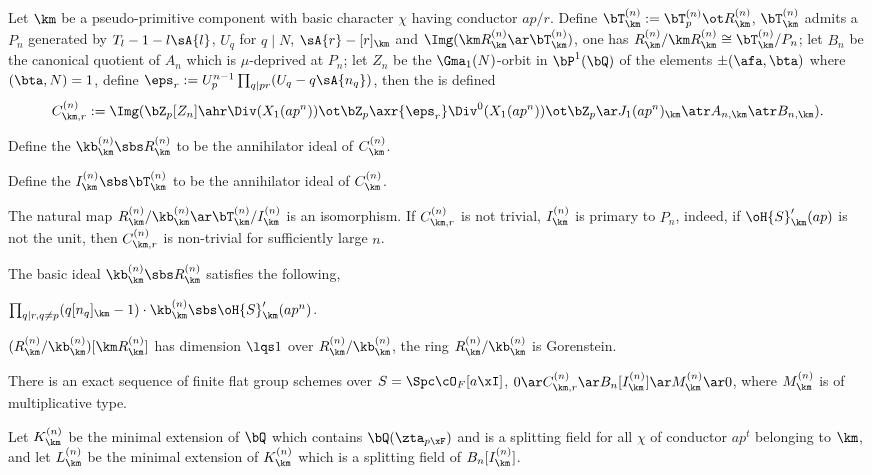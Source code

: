 \documentclass[article, a4paper, twoside]{universal}
\begin{document}
\begin{dfn}[{\cite[4.3~Definition, 5.1]{MW1984}}]
	Let $\km$ be a pseudo-primitive component with basic character $\chi$ having conductor $ap/r$. Define $\bT^{(n)}_{\km}:=\bT^{(n)}_{p}\ot R_{\km}^{(n)}$, $\bT_{\km}^{(n)}$ admits a  $P_{n}$ generated by $T_{l}-1-l\sA{l}$, $U_{q}$ for $q\mid N$, $\sA{r}-[r]_{\km}$ and $\Img(\km R_{\km}^{(n)}\ar\bT_{\km}^{(n)})$, one has $R_{\km}^{(n)}/\km R_{\km}^{(n)}\cong \bT_{\km}^{(n)}/P_{n}$; let $B_{n}$ be the canonical quotient of $A_{n}$ which is $\mu$-deprived at $P_{n}$; let $Z_{n}$ be the $\Gma_{1}(N)$-orbit in $\bP^{1}(\bQ)$ of the elements $\pm(\afa,\bta)$ where $(\bta,N)=1$, define $\eps_{r}:=U_{p}^{n-1}\prod_{q\mid pr}(U_{q}-q\sA{n_{q}})$, then the  is defined
	\[
		C_{\km,r}^{(n)}:=\Img(\bZ_{p}[Z_{n}]\ahr\Div(X_{1}(ap^{n}))\ot\bZ_{p}\axr{\eps_{r}}\Div^{0}(X_{1}(ap^{n}))\ot\bZ_{p}\ar J_{1}(ap^{n})_{\km}\atr A_{n,\km}\atr B_{n,\km}).
	\]
	\begin{itm}
		\item Define the  $\kb_{\km}^{(n)}\sbs R_{\km}^{(n)}$ to be the annihilator ideal of $C_{\km}^{(n)}$.
		\item Define the  $I_{\km}^{(n)}\sbs\bT_{\km}^{(n)}$ to be the annihilator ideal of $C_{\km}^{(n)}$.
	\end{itm}
	The natural map $R_{\km}^{(n)}/\kb_{\km}^{(n)}\ar\bT_{\km}^{(n)}/I_{\km}^{(n)}$ is an isomorphism. If $C_{\km,r}^{(n)}$ is not trivial, $I_{\km}^{(n)}$ is primary to $P_{n}$, indeed, if $\oH{S}_{\km}'(ap)$ is not the unit, then $C_{\km,r}^{(n)}$ is non-trivial for sufficiently large $n$.
\end{dfn}

\begin{thm}[{\cite[4.3~Theorem]{MW1984}}]
	The basic ideal $\kb_{\km}^{(n)}\sbs R_{\km}^{(n)}$ satisfies the following,
	\begin{itm}
		\item $\prod_{q\mid r, q\neq p}(q[n_{q}]_{\km}-1)\cdot \kb_{\km}^{(n)}\sbs\oH{S}_{\km}'(ap^{n})$.
		\item $(R_{\km}^{(n)}/\kb_{\km}^{(n)})[\km R_{\km}^{(n)}]$ has dimension $\lqs1$ over $R_{\km}^{(n)}/\kb_{\km}^{(n)}$, the ring $R_{\km}^{(n)}/\kb_{\km}^{(n)}$ is Gorenstein.
	\end{itm}
\end{thm}

\begin{dfn}[{\cite[5.2~Lemma~4]{MW1984}}]
	There is an exact sequence of finite flat group schemes over $S=\Spc\cO_{F}[a\xI]$, $0\ar C_{\km,r}^{(n)}\ar B_{n}[I_{\km}^{(n)}] \ar M_{\km}^{(n)}\ar 0$, where $M_{\km}^{(n)}$ is of multiplicative type.

	Let $K_{\km}^{(n)}$ be the minimal extension of $\bQ$ which contains $\bQ(\zta_{p\xF})$ and is a splitting field for all $\chi$ of conductor $ap^{t}$ belonging to $\km$, and let $L_{\km}^{(n)}$ be the minimal extension of $K_{\km}^{(n)}$ which is a splitting field of $B_{n}[I_{\km}^{(n)}]$.
\end{dfn}
\end{document}
